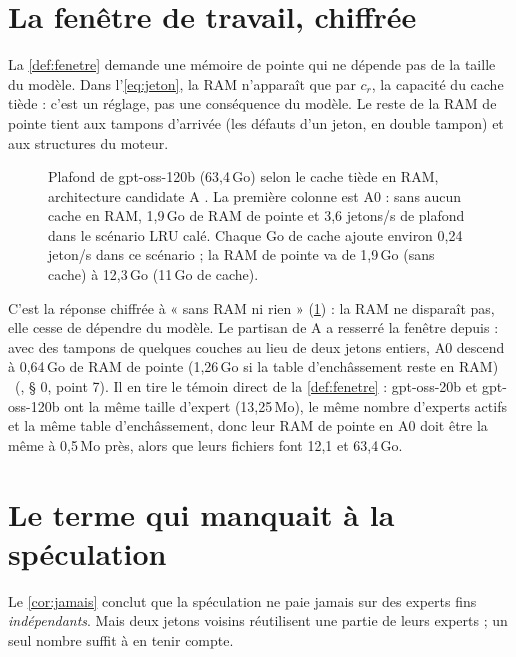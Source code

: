 \section{La fenêtre de travail, chiffrée}\label{sec:fenetre-chiffree}

La \cref{def:fenetre} demande une mémoire de pointe qui ne dépende pas de la taille du modèle. Dans l'\cref{eq:jeton}, la RAM n'apparaît que par $c_r$, la capacité du cache tiède : c'est un réglage, pas une conséquence du modèle. Le reste de la RAM de pointe tient aux tampons d'arrivée (les défauts d'un jeton, en double tampon) et aux structures du moteur.

\begin{figure}[ht]
\centering
\GraphePlafondRam
\caption[La fenêtre de travail : plafond selon la RAM]{Plafond de gpt-oss-120b (63,4\,Go) selon le cache tiède en RAM, architecture candidate A \calc. La première colonne est A0 : sans aucun cache en RAM, 1,9\,Go de RAM de pointe et 3,6 jetons/s de plafond dans le scénario LRU calé. Chaque Go de cache ajoute environ 0,24 jeton/s dans ce scénario ; la RAM de pointe va de 1,9\,Go (sans cache) à 12,3\,Go (11\,Go de cache).}
\label{fig:plafond-ram}
\end{figure}

C'est la réponse chiffrée à « sans RAM ni rien » (\cref{fig:plafond-ram}) : la RAM ne disparaît pas, elle cesse de dépendre du modèle. Le partisan de A a resserré la fenêtre depuis : avec des tampons de quelques couches au lieu de deux jetons entiers, A0 descend à 0,64\,Go de RAM de pointe (1,26\,Go si la table d'enchâssement reste en RAM) \calc~(, § 0, point 7). Il en tire le témoin direct de la \cref{def:fenetre} : gpt-oss-20b et gpt-oss-120b ont la même taille d'expert (13,25\,Mo), le même nombre d'experts actifs et la même table d'enchâssement, donc leur RAM de pointe en A0 doit être la même à 0,5\,Mo près, alors que leurs fichiers font 12,1 et 63,4\,Go.

\section{Le terme qui manquait à la spéculation}\label{sec:spec-rho}

Le \cref{cor:jamais} conclut que la spéculation ne paie jamais sur des experts fins \emph{indépendants}. Mais deux jetons voisins réutilisent une partie de leurs experts ; un seul nombre suffit à en tenir compte.

